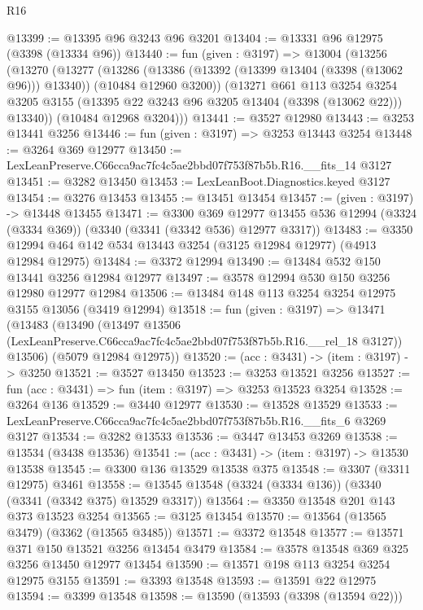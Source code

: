 \begin{lexlean}{R16}
\begin{coremodule}
@13399 := @13395 @96 @3243 @96 @3201
@13404 := @13331 @96 @12975 (@3398 (@13334 @96))
@13440 := fun (given : @3197) =>
  @13004
    (@13256
      (@13270
        (@13277
          (@13286
            (@13386 (@13392 (@13399 @13404 (@3398 (@13062 @96))) @13340))
            (@10484 @12960 @3200))
          (@13271
            @661
            @113
            @3254
            @3254
            @3205
            @3155
            (@13395 @22 @3243 @96 @3205 @13404 (@3398 (@13062 @22)))
            @13340))
        (@10484 @12968 @3204)))
@13441 := @3527 @12980
@13443 := @3253 @13441 @3256
@13446 := fun (given : @3197) => @3253 @13443 @3254
@13448 := @3264 @369 @12977
@13450 := LexLeanPreserve.C66cca9ac7fc4c5ae2bbd07f753f87b5b.R16.__fits_14 @3127
@13451 := @3282 @13450
@13453 := LexLeanBoot.Diagnostics.keyed @3127
@13454 := @3276 @13453
@13455 := @13451 @13454
@13457 := (given : @3197) -> @13448 @13455
@13471 := @3300
    @369
    @12977
    @13455
    @536
    @12994
    (@3324 (@3334 @369))
    (@3340 (@3341 (@3342 @536) @12977 @3317))
@13483 := @3350 @12994 @464 @142 @534 @13443 @3254 (@3125 @12984 @12977) (@4913 @12984 @12975)
@13484 := @3372 @12994
@13490 := @13484 @532 @150 @13441 @3256 @12984 @12977
@13497 := @3578 @12994 @530 @150 @3256 @12980 @12977 @12984
@13506 := @13484 @148 @113 @3254 @3254 @12975 @3155 @13056 (@3419 @12994)
@13518 := fun (given : @3197) =>
  @13471
    (@13483
      (@13490
        (@13497 @13506 (LexLeanPreserve.C66cca9ac7fc4c5ae2bbd07f753f87b5b.R16.__rel_18 @3127))
        @13506)
      (@5079 @12984 @12975))
@13520 := (acc : @3431) -> (item : @3197) -> @3250
@13521 := @3527 @13450
@13523 := @3253 @13521 @3256
@13527 := fun (acc : @3431) => fun (item : @3197) => @3253 @13523 @3254
@13528 := @3264 @136
@13529 := @3440 @12977
@13530 := @13528 @13529
@13533 := LexLeanPreserve.C66cca9ac7fc4c5ae2bbd07f753f87b5b.R16.__fits_6 @3269 @3127
@13534 := @3282 @13533
@13536 := @3447 @13453 @3269
@13538 := @13534 (@3438 @13536)
@13541 := (acc : @3431) -> (item : @3197) -> @13530 @13538
@13545 := @3300 @136 @13529 @13538 @375
@13548 := @3307 (@3311 @12975) @3461
@13558 := @13545 @13548 (@3324 (@3334 @136)) (@3340 (@3341 (@3342 @375) @13529 @3317))
@13564 := @3350 @13548 @201 @143 @373 @13523 @3254
@13565 := @3125 @13454
@13570 := @13564 (@13565 @3479) (@3362 (@13565 @3485))
@13571 := @3372 @13548
@13577 := @13571 @371 @150 @13521 @3256 @13454 @3479
@13584 := @3578 @13548 @369 @325 @3256 @13450 @12977 @13454
@13590 := @13571 @198 @113 @3254 @3254 @12975 @3155
@13591 := @3393 @13548
@13593 := @13591 @22 @12975
@13594 := @3399 @13548
@13598 := @13590 (@13593 (@3398 (@13594 @22)))

\end{coremodule}
\end{lexlean}
